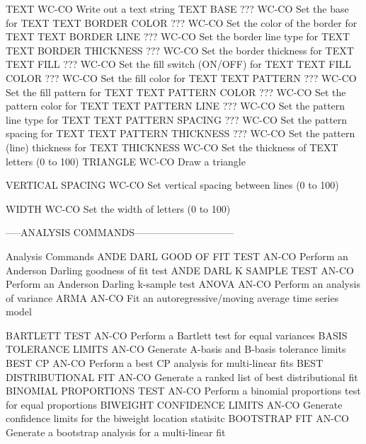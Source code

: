 TEXT                        WC-CO Write out a text string
TEXT BASE              ???  WC-CO Set the base for TEXT
TEXT BORDER COLOR      ???  WC-CO Set the color of the border for TEXT
TEXT BORDER LINE       ???  WC-CO Set the border line type for TEXT
TEXT BORDER THICKNESS  ???  WC-CO Set the border thickness for TEXT
TEXT FILL              ???  WC-CO Set the fill switch (ON/OFF) for TEXT
TEXT FILL COLOR        ???  WC-CO Set the fill color for TEXT
TEXT PATTERN           ???  WC-CO Set the fill pattern for TEXT
TEXT PATTERN COLOR     ???  WC-CO Set the pattern color for TEXT
TEXT PATTERN LINE      ???  WC-CO Set the pattern line type for TEXT
TEXT PATTERN SPACING   ???  WC-CO Set the pattern spacing for TEXT
TEXT PATTERN THICKNESS ???  WC-CO Set the pattern (line) thickness for TEXT
THICKNESS                   WC-CO Set the thickness of TEXT letters (0 to 100)
TRIANGLE                    WC-CO Draw a triangle

VERTICAL SPACING            WC-CO Set vertical spacing between lines (0 to 100)

WIDTH                       WC-CO Set the width of letters (0 to 100)

-----ANALYSIS COMMANDS------------------------------

Analysis Commands
ANDE DARL GOOD OF FIT TEST  AN-CO Perform an Anderson Darling goodness of fit test
ANDE DARL K SAMPLE TEST     AN-CO Perform an Anderson Darling k-sample test
ANOVA                       AN-CO Perform an analysis of variance
ARMA                        AN-CO Fit an autoregressive/moving average time series model

BARTLETT TEST               AN-CO Perform a Bartlett test for equal variances
BASIS TOLERANCE LIMITS      AN-CO Generate A-basis and B-basis tolerance limits
BEST CP                     AN-CO Perform a best CP analysis for multi-linear fits
BEST DISTRIBUTIONAL FIT     AN-CO Generate a ranked list of best distributional fit
BINOMIAL PROPORTIONS TEST   AN-CO Perform a binomial proportions test for equal proportions
BIWEIGHT CONFIDENCE LIMITS  AN-CO Generate confidence limits for the biweight location statisitc
BOOTSTRAP FIT               AN-CO Generate a bootstrap analysis for a multi-linear fit


